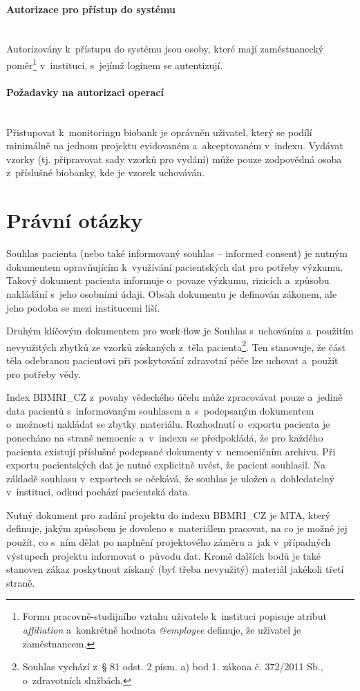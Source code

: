 \documentclass[11pt, final, oneside]{fithesis2}
\newcommand{\paragraphNewLine}[1]{\paragraph*{#1}\mbox{}\\}
\newcommand{\ProjectName}{\mbox{BBMRI\_CZ}\xspace}
\begin{document}
\paragraphNewLine{Autorizace pro přístup do systému}
Autorizovány k~přístupu do systému jsou osoby, které mají zaměstnanecký poměr\footnote{Formu pracovně-studijního vztahu uživatele k~instituci popisuje atribut \textit{affiliation} a~konkrétně hodnota \textit{@employee} definuje, že uživatel je zaměstnancem.} v~instituci, s~jejímž loginem se autentizují.

\paragraphNewLine{Požadavky na autorizaci operací}
Přistupovat k~monitoringu biobank je oprávněn uživatel, který se podílí minimálně na jednom projektu evidovaném a~akceptovaném v~indexu.
Vydávat vzorky (tj. připravovat sady vzorků pro vydání) může pouze zodpovědná osoba z~příslušné biobanky, kde je vzorek uchováván.

\section{Právní otázky}\label{chapter:analysis:section:legal}
Souhlas pacienta (nebo také informovaný souhlas -- informed consent) je nutným dokumentem opravňujícím k~využívání pacientských dat pro potřeby výzkumu. Takový dokument pacienta informuje o~povaze výzkumu, rizicích a~způsobu nakládání s~jeho osobními údaji. Obsah dokumentu je definován zákonem, ale jeho podoba se mezi institucemi liší. 

Druhým klíčovým dokumentem pro work-flow je Souhlas s~uchováním a~použitím nevyužitých zbytků ze vzorků získaných z~těla pacienta\footnote{Souhlas vychází z~§ 81 odst. 2 písm. a) bod 1. zákona č. 372/2011 Sb., o~zdravotních službách.}. Ten stanovuje, že část těla odebranou pacientovi při poskytování zdravotní péče lze uchovat a~použít pro potřeby vědy. 

Index \ProjectName z~povahy vědeckého účelu může zpracovávat pouze a~jedině data pacientů s~informovaným souhlasem a~s~podepsaným dokumentem o~možnosti nakládat se zbytky materiálu. Rozhodnutí o~exportu pacienta je ponecháno na straně nemocnic a~v~indexu se předpokládá, že pro každého pacienta existují příslušné podepsané dokumenty v~nemocničním archivu.
Při exportu pacientských dat je nutné explicitně uvést, že pacient souhlasil. Na základě souhlasu v~exportech se očekává, že souhlas je uložen a~dohledatelný  v~instituci, odkud pochází pacientská data.

Nutný dokument pro zadání projektu do indexu \ProjectName je MTA, který definuje, jakým způsobem je dovoleno s~materiálem pracovat, na co je možné jej použít, co s~ním dělat po naplnění projektového záměru a~jak v~případných výstupech projektu informovat o~původu dat. Kromě dalších bodů je také stanoven zákaz poskytnout získaný (byť třeba nevyužitý) materiál jakékoli třetí straně.
\end{document}
